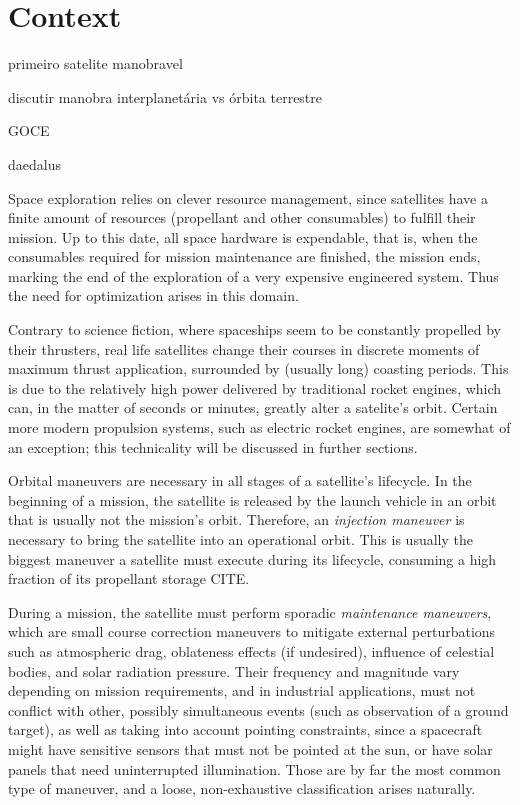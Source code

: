 \section{Context}



primeiro satelite manobravel


discutir manobra interplanetária vs órbita terrestre

GOCE

daedalus

Space exploration relies on clever resource management, since satellites have a finite amount of resources (propellant and other consumables) to fulfill their mission. Up to this date, all space hardware is expendable, that is, when the consumables required for mission maintenance are finished, the mission ends, marking the end of the exploration of a very expensive engineered system. Thus the need for optimization arises in this domain.

Contrary to science fiction, where spaceships seem to be constantly propelled by their thrusters, real life satellites change their courses in discrete moments of maximum thrust application, surrounded by (usually long) coasting periods. This is due to the relatively high power delivered by traditional rocket engines, which can, in the matter of seconds or minutes, greatly alter a satelite's orbit. Certain more modern propulsion systems, such as electric rocket engines, are somewhat of an exception; this technicality will be discussed in further sections.

Orbital maneuvers are necessary in all stages of a satellite's lifecycle. In the beginning of a mission, the satellite is released by the launch vehicle in an orbit that is usually not the mission's orbit. Therefore, an \textit{injection maneuver} is necessary to bring the satellite into an operational orbit. This is usually the biggest maneuver a satellite must execute during its lifecycle, consuming a high fraction of its propellant storage CITE\@. 

During a mission, the satellite must perform sporadic \textit{maintenance maneuvers}, which are small course correction maneuvers to mitigate external perturbations such as atmospheric drag, oblateness effects (if undesired), influence of celestial bodies, and solar radiation pressure. Their frequency and magnitude vary depending on mission requirements, and in industrial applications, must not conflict with other, possibly simultaneous events (such as observation of a ground target), as well as taking into account pointing constraints, since a spacecraft might have sensitive sensors that must not be pointed at the sun, or have solar panels that need uninterrupted illumination. Those are by far the most common type of maneuver, and a loose, non-exhaustive classification arises naturally.

